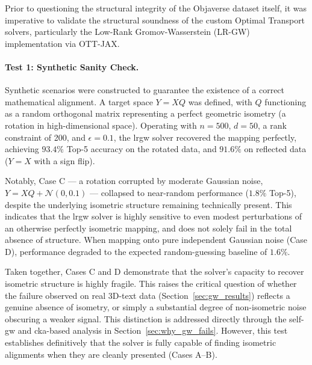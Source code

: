 Prior to questioning the structural integrity of the Objaverse dataset itself, it was imperative to validate the structural soundness of the custom Optimal Transport solvers, particularly the Low-Rank Gromov-Wasserstein (LR-GW) implementation via OTT-JAX.

\paragraph{Test 1: Synthetic Sanity Check.}
Synthetic scenarios were constructed to guarantee the existence of a correct mathematical alignment. A target space $Y = XQ$ was defined, with $Q$ functioning as a random orthogonal matrix representing a perfect geometric isometry (a rotation in high-dimensional space). Operating with $n=500$, $d=50$, a rank constraint of 200, and $\epsilon=0.1$, the \gls{lrgw} solver recovered the mapping perfectly, achieving $93.4\%$ Top-5 accuracy on the rotated data, and $91.6\%$ on reflected data ($Y = X$ with a sign flip).

Notably, Case C --- a rotation corrupted by moderate Gaussian noise, $Y = XQ + \mathcal{N}(0, 0.1)$ --- collapsed to near-random performance ($1.8\%$ Top-5), despite the underlying isometric structure remaining technically present. This indicates that the \gls{lrgw} solver is highly sensitive to even modest perturbations of an otherwise perfectly isometric mapping, and does not solely fail in the total absence of structure. When mapping onto pure independent Gaussian noise (Case D), performance degraded to the expected random-guessing baseline of $1.6\%$.

Taken together, Cases C and D demonstrate that the solver's capacity to recover isometric structure is highly fragile. This raises the critical question of whether the failure observed on real 3D-text data (Section~\ref{sec:gw_results}) reflects a genuine absence of isometry, or simply a substantial degree of non-isometric noise obscuring a weaker signal. This distinction is addressed directly through the self-\gls{gw} and \gls{cka}-based analysis in Section~\ref{sec:why_gw_fails}. However, this test establishes definitively that the solver is fully capable of finding isometric alignments when they are cleanly presented (Cases A--B).

